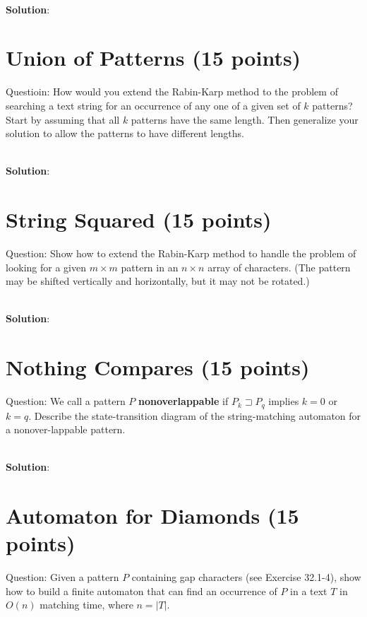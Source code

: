 \documentclass{article}
\begin{document}
~\\
\textbf{Solution}:\newline
\indent 


\section{Union of Patterns (15 points)}
Questioin: How would you extend the Rabin-Karp method to the problem of searching a text string for an occurrence of any one of a given set of $k$ patterns? Start by assuming that all $k$ patterns have the same length. Then generalize your solution to allow the patterns to have different lengths.

~\\
\textbf{Solution}:\newline
\indent 


\section{String Squared (15 points)}
Question: Show how to extend the Rabin-Karp method to handle the problem of looking for a given $m \times m$ pattern in an $n \times n$ array of characters. (The pattern may be shifted vertically and horizontally, but it may not be rotated.)

~\\
\textbf{Solution}:\newline
\indent 


\section{Nothing Compares (15 points)}
Question: We call a pattern $P$ \textbf{nonoverlappable} if $P_{k} \sqsupset P_{q}$ implies $k = 0$ or $k = q$. Describe the state-transition diagram of the string-matching automaton for a nonover-lappable pattern.

~\\
\textbf{Solution}:\newline
\indent 
\section{Automaton for Diamonds (15 points)}
Question: Given a pattern $P$ containing gap characters (see Exercise 32.1-4), show how to build a finite automaton that can find an occurrence of $P$ in a text $T$ in $O(n)$ matching time, where $n = |T|$.
\end{document}
